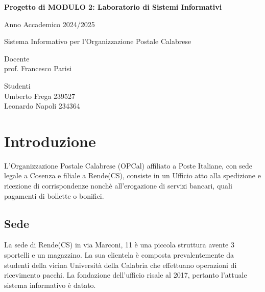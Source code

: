 \documentclass{article}
\author{Umberto Frega, Leonardo Napoli}
\begin{document}
\pagestyle{fancy}

\begin{titlepage}
  \centering
  {\Large \bfseries Progetto di MODULO 2: Laboratorio di Sistemi Informativi\par}
  {\Large Anno Accademico 2024/2025 \par}
  \vspace{1cm} %
  \vfill
  {\huge Sistema Informativo per l'Organizzazione Postale Calabrese\par}
  \vfill
  \noindent
  \begin{minipage}[t]{0.5\textwidth}
    \raggedright
    Docente \\  prof. Francesco Parisi
  \end{minipage}%
  \hfill
  \begin{minipage}[t]{0.4\textwidth}
    \raggedleft
    Studenti \\ Umberto Frega 239527 \\ Leonardo Napoli 234364
  \end{minipage}

\end{titlepage}

\section{Introduzione}
L'Organizzazione Postale Calabrese (OPCal) affiliato a Poste Italiane, con sede legale a Cosenza e filiale a Rende(CS), consiste in un Ufficio atto alla spedizione e ricezione di corrispondenze nonchè all'erogazione di servizi bancari, quali pagamenti di bollette o bonifici. 
\subsection{Sede}
La sede di Rende(CS) in via Marconi, 11 è una piccola struttura avente 3 sportelli e un magazzino. La sua clientela è composta prevalentemente da studenti della vicina Università della Calabria che effettuano operazioni di ricevimento pacchi. La fondazione dell'ufficio risale al 2017, pertanto l'attuale sistema informativo è datato. 
\end{document}
